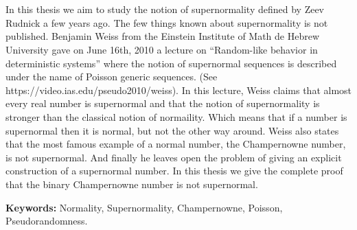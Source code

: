 \chapter*{\runtitle}

\noindent In this thesis we aim to study the notion of supernormality defined by Zeev Rudnick a few years ago.
The few things known about supernormality is not published. Benjamin Weiss from the Einstein Institute of Math de Hebrew University gave on June 16th, 2010 a lecture on “Random-like behavior
in deterministic systems” where the notion of supernormal sequences is described under the name of Poisson generic sequences. (See https://video.ias.edu/pseudo2010/weiss).
In this lecture, Weiss claims that almost every real number is supernormal and that the notion of supernormality is stronger than the classical notion of normaility. Which means that if a number is supernormal then it is normal, but not the other way around.
Weiss also states that the most famous example of a normal number, the Champernowne number, is not supernormal. And finally he leaves open the problem of giving an explicit construction of a supernormal number.
In this thesis we give the complete proof that the binary Champernowne number is not supernormal.
\bigskip

\noindent\textbf{Keywords:} Normality, Supernormality, Champernowne, Poisson, Pseudorandomness.